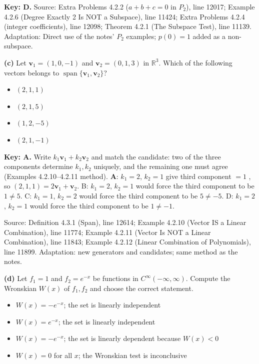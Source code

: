 \documentclass[11pt,a4paper]{article}
\newcommand{\Src}[1]{{\footnotesize\color{black!65}Source: #1}}
\begin{document}
\textbf{Key: D.} \Src{Extra Problems 4.2.2 ($a+b+c=0$ in $P_2$), line 12017; Example 4.2.6 (Degree Exactly 2 Is NOT a Subspace), line 11424; Extra Problems 4.2.4 (integer coefficients), line 12098; Theorem 4.2.1 (The Subspace Test), line 11139. Adaptation: Direct use of the notes' $P_2$ examples; $p(0)=1$ added as a non-subspace.}\par
\textbf{(c)} Let $\mathbf{v}_1=(1,0,-1)$ and $\mathbf{v}_2=(0,1,3)$ in $\mathbb{R}^3$. Which of the following vectors belongs to $\operatorname{span}\{\mathbf{v}_1,\mathbf{v}_2\}$?\par
\begin{itemize}[leftmargin=8mm,itemsep=0pt]\item[A$^{\ast}$] $(2,1,1)$\item[B] $(2,1,5)$\item[C] $(1,2,-5)$\item[D] $(2,1,-1)$\end{itemize}
\textbf{Key: A.} Write $k_1\mathbf{v}_1+k_2\mathbf{v}_2$ and match the candidate: two of the three components determine $k_1,k_2$ uniquely, and the remaining one must agree (Examples 4.2.10--4.2.11 method). \textbf{A}: $k_1=2$, $k_2=1$ give third component $=1$ \checkmark, so $(2,1,1)=2\mathbf{v}_1+\mathbf{v}_2$. B: $k_1=2$, $k_2=1$ would force the third component to be $1\neq5$. C: $k_1=1$, $k_2=2$ would force the third component to be $5\neq-5$. D: $k_1=2$, $k_2=1$ would force the third component to be $1\neq-1$.\par
\Src{Definition 4.3.1 (Span), line 12614; Example 4.2.10 (Vector IS a Linear Combination), line 11774; Example 4.2.11 (Vector Is NOT a Linear Combination), line 11843; Example 4.2.12 (Linear Combination of Polynomials), line 11899. Adaptation: new generators and candidates; same method as the notes.}\par
\textbf{(d)} Let $f_1=1$ and $f_2=e^{-x}$ be functions in $C^{\infty}(-\infty,\infty)$. Compute the Wronskian $W(x)$ of $f_1,f_2$ and choose the correct statement.\par
\begin{itemize}[leftmargin=8mm,itemsep=0pt]\item[A$^{\ast}$] $W(x)=-e^{-x}$; the set is linearly independent\item[B] $W(x)=e^{-x}$; the set is linearly independent\item[C] $W(x)=-e^{-x}$; the set is linearly dependent because $W(x)<0$\item[D] $W(x)=0$ for all $x$; the Wronskian test is inconclusive\end{itemize}
\end{document}
